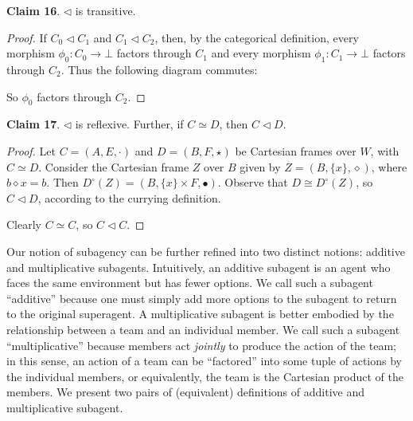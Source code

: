 \documentclass{article}
\begin{document}
\bigskip
\noindent \textbf{Claim 16}.
$\triangleleft$ is transitive.

\begin{proof}
If $C_0 \triangleleft C_1$ and $C_1 \triangleleft C_2$, then, by the categorical definition, every morphism $\phi_0 : C_0 \to \bot$ factors through $C_1$ and every morphism $\phi_1 : C_1 \to \bot$ factors through $C_2$.
Thus the following diagram commutes:

\begin{center}
\end{center}
So $\phi_0$ factors through $C_2$.
\end{proof}

\bigskip
\noindent \textbf{Claim 17}.
$\triangleleft$ is reflexive. Further, if $C \simeq D$, then $C \triangleleft D$.

\begin{proof}
Let $C = (A, E, \cdot)$ and $D = (B, F, \star)$ be Cartesian frames over $W$, with $C \simeq D$.
Consider the Cartesian frame $Z$ over $B$ given by $Z = (B, \{x\}, \diamond)$, where $b \diamond x = b$.
Then $D^{\circ}(Z) = (B, \{x\} \times F, \bullet)$.
Observe that $D \cong D^{\circ}(Z)$, so $C \triangleleft D$, according to the currying definition.

Clearly $C \simeq C$, so $C \triangleleft C$.
\end{proof}

\noindent Our notion of subagency can be further refined into two distinct notions: additive and multiplicative subagents.
Intuitively, an additive subagent is an agent who faces the same environment but has fewer options.
We call such a subagent ``additive'' because one must simply add more options to the subagent to return to the original superagent.
A multiplicative subagent is better embodied by the relationship between a team and an individual member.
We call such a subagent ``multiplicative'' because members act \emph{jointly} to produce the action of the team;
in this sense, an action of a team can be ``factored'' into some tuple of actions by the individual members, or equivalently, the team is the Cartesian product of the members. We present two pairs of (equivalent) definitions of additive and multiplicative subagent.
\end{document}
